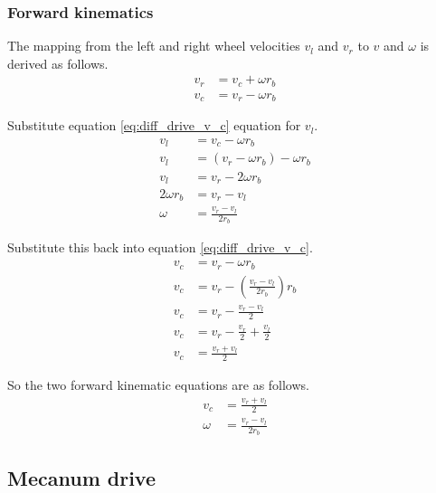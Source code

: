 \subsubsection{Forward kinematics}

The mapping from the left and right wheel velocities $v_l$ and $v_r$ to $v$ and
$\omega$ is derived as follows.
\begin{align}
  v_r &= v_c + \omega r_b \nonumber \\
  v_c &= v_r - \omega r_b \label{eq:diff_drive_v_c}
\end{align}

Substitute equation \eqref{eq:diff_drive_v_c} equation for $v_l$.
\begin{align*}
  v_l &= v_c - \omega r_b \\
  v_l &= (v_r - \omega r_b) - \omega r_b \\
  v_l &= v_r - 2\omega r_b \\
  2\omega r_b &= v_r - v_l \\
  \omega &= \frac{v_r - v_l}{2 r_b}
\end{align*}

Substitute this back into equation \eqref{eq:diff_drive_v_c}.
\begin{align*}
  v_c &= v_r - \omega r_b \\
  v_c &= v_r - \left(\frac{v_r - v_l}{2 r_b}\right) r_b \\
  v_c &= v_r - \frac{v_r - v_l}{2} \\
  v_c &= v_r - \frac{v_r}{2} + \frac{v_l}{2} \\
  v_c &= \frac{v_r + v_l}{2}
\end{align*}

So the two forward kinematic equations are as follows.
\begin{align}
  v_c &= \frac{v_r + v_l}{2} \\
  \omega &= \frac{v_r - v_l}{2 r_b}
\end{align}

\subsection{Mecanum drive}

